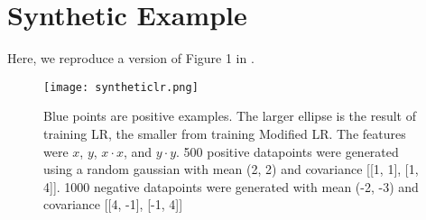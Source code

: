 \documentclass[]{article}
\begin{document}
\section{Synthetic Example}

Here, we reproduce a version of Figure 1 in \cite{elkan08}. 

\label{Synthetic data}
\begin{figure}[ht!]
\centering
\texttt{[image: syntheticlr.png]}
\caption{Blue points are positive examples. The larger ellipse is the result of training LR, the smaller from training Modified LR. The features were $x$, $y$, $x \cdot x$, and $y \cdot y$.   500 positive datapoints were generated using a random gaussian with mean (2, 2) and covariance [[1, 1], [1, 4]].  1000 negative datapoints were generated with mean (-2, -3) and covariance [[4, -1], [-1, 4]]}
\end{figure}



\end{document}
